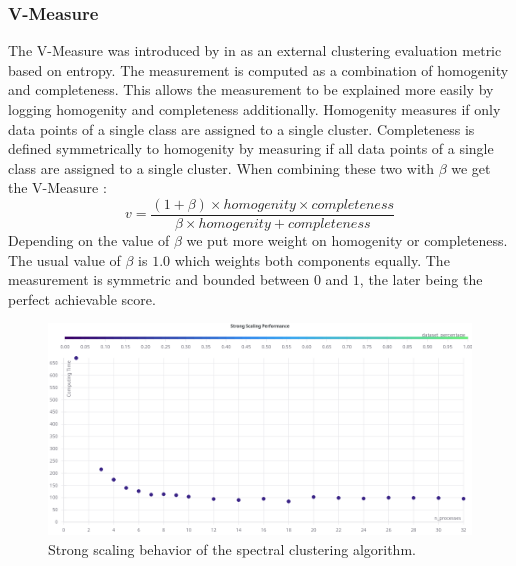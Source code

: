 \subsubsection{V-Measure}
\label{ssec:v_measure}
The V-Measure was introduced by \citeauthor{rosenberg_v-measure_2007} in \cite{rosenberg_v-measure_2007} as an external clustering evaluation metric based on entropy.
The measurement is computed as a combination of homogenity and completeness. This allows the measurement to be explained more easily by logging homogenity and completeness additionally.
Homogenity measures if only data points of a single class are assigned to a single cluster. Completeness is defined symmetrically to homogenity by measuring if all data points of a single class are assigned to
a single cluster.
When combining these two with \(\beta\) we get the V-Measure \cite{noauthor_23_2020}:
\[v = \frac{(1 + \beta) \times \mathit{homogenity} \times \mathit{completeness}}{\beta \times \mathit{homogenity} + \mathit{completeness}}\]
Depending on the value of \(\beta\) we put more weight on homogenity or completeness. The usual value of \(\beta\) is \(1.0\) which weights both components equally.
The measurement is symmetric and bounded between \(0\) and \(1\), the later being the perfect achievable score.



\begin{figure}
  \includegraphics[width=0.9\linewidth]{images/strong_scaling_chart.png}
  \caption{Strong scaling behavior of the spectral clustering algorithm.}\label{fig:strong_scaling}
\end{figure}
